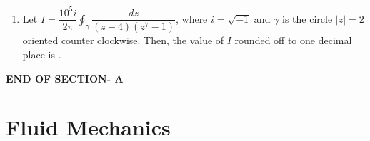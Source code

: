 \documentclass[journal,12pt,onecolumn]{IEEEtran}
\begin{document}
\begin{enumerate}[label=\arabic*)]
\vspace{0.5cm}

\item Let $I=\dfrac{10^5i}{2\pi}\oint_{\gamma}\dfrac{dz}{(z-4)(z^7-1)}$, where $i=\sqrt{-1}$ and $\gamma$ is the circle $|z|=2$ oriented counter clockwise. Then, the value of $I$ rounded off to one decimal place is \underline{\hspace{2cm}}.
\hfill{} \\

\end{enumerate}

\vspace{2\baselineskip}
\begin{center}
    \item[\textbf{END OF SECTION- A}]
\end{center}


\newpage


\section*{Fluid Mechanics}
\noindent
\vspace{1cm}
\end{document}
